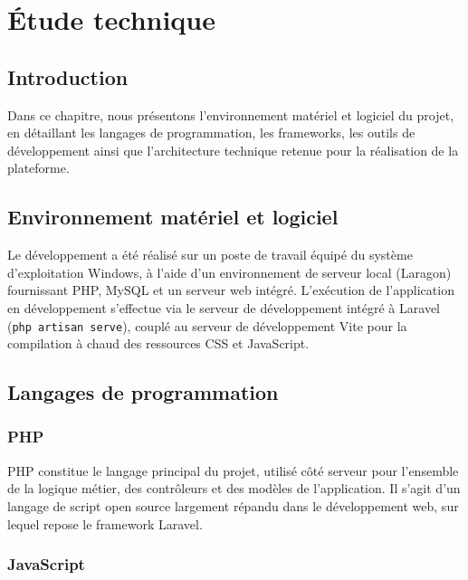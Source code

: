 \documentclass[12pt,a4paper]{report}
\begin{document}
\chapter{Étude technique}

\section{Introduction}

Dans ce chapitre, nous présentons l'environnement matériel et logiciel du
projet, en détaillant les langages de programmation, les frameworks, les
outils de développement ainsi que l'architecture technique retenue pour la
réalisation de la plateforme.

\section{Environnement matériel et logiciel}

Le développement a été réalisé sur un poste de travail équipé du système
d'exploitation Windows, à l'aide d'un environnement de serveur local
(Laragon) fournissant PHP, MySQL et un serveur web intégré. L'exécution de
l'application en développement s'effectue via le serveur de développement
intégré à Laravel (\texttt{php artisan serve}), couplé au serveur de
développement Vite pour la compilation à chaud des ressources CSS et
JavaScript.

\section{Langages de programmation}

\subsection{PHP}

PHP constitue le langage principal du projet, utilisé côté serveur pour
l'ensemble de la logique métier, des contrôleurs et des modèles de
l'application. Il s'agit d'un langage de script open source largement
répandu dans le développement web, sur lequel repose le framework Laravel.

\subsection{JavaScript}
\end{document}
